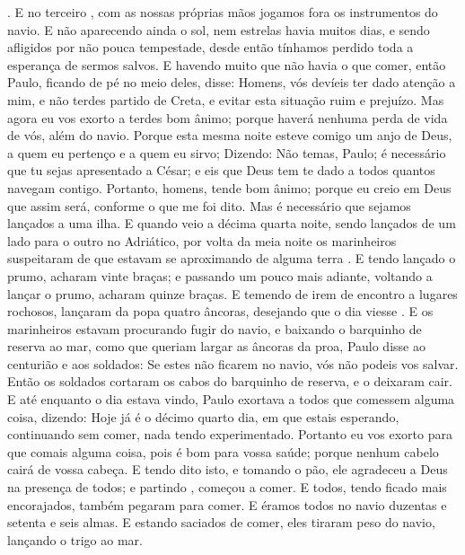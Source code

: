 {{} .
E no terceiro
{} , com as nossas próprias mãos jogamos fora os instrumentos do navio.
E não aparecendo ainda o sol, nem estrelas havia muitos dias, e sendo afligidos por não pouca tempestade, desde então tínhamos perdido toda a esperança de sermos salvos.
E havendo muito
{} que não havia o que comer, então Paulo, ficando de pé no meio deles, disse: Homens, vós devíeis ter dado atenção a mim, e não terdes partido de Creta, e
{} evitar esta situação ruim e prejuízo.
Mas agora eu vos exorto a terdes bom ânimo; porque haverá nenhuma perda de vida de vós, além
{} do navio.
Porque esta mesma noite esteve comigo um anjo de Deus, a quem eu pertenço e a quem eu sirvo;
Dizendo: Não temas, Paulo; é necessário que tu sejas apresentado a César; e eis que Deus tem te dado
{} a todos quantos navegam contigo.
Portanto, homens, tende bom ânimo; porque eu creio em Deus que assim será, conforme o que me foi dito.
Mas é necessário que sejamos lançados a uma ilha.
E quando veio a décima quarta noite, sendo lançados de um lado para o outro no
{} Adriático, por volta da meia noite os marinheiros suspeitaram de que estavam se aproximando de alguma terra
{} .
E tendo lançado o prumo, acharam vinte braças; e passando um pouco mais adiante, voltando a lançar o prumo, acharam quinze braças.
E temendo de irem de encontro a lugares rochosos, lançaram da popa quatro âncoras, desejando que o dia viesse
{} .
E
{} os marinheiros estavam procurando fugir do navio, e baixando o barquinho de reserva ao mar, como que queriam largar as âncoras da proa,
Paulo disse ao centurião e aos soldados: Se estes não ficarem no navio, vós não podeis vos salvar.
Então os soldados cortaram os cabos do barquinho de reserva, e o deixaram cair.
E até enquanto o dia estava vindo, Paulo exortava a todos que comessem alguma coisa, dizendo: Hoje já é o décimo quarto dia, em que estais esperando, continuando sem comer, nada tendo experimentado.
Portanto eu vos exorto para que comais alguma coisa, pois é bom para vossa saúde; porque nenhum cabelo cairá de vossa cabeça.
E tendo dito isto, e tomando o pão, ele agradeceu a Deus na presença de todos; e partindo
{} , começou a comer.
E todos, tendo ficado mais encorajados, também pegaram
{} para comer.
E éramos todos no navio duzentas e setenta e seis almas.
E estando saciados de comer, eles tiraram peso do navio, lançando o trigo ao mar.
}
